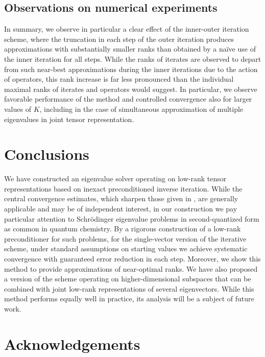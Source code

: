 \documentclass[a4paper,11pt,oneside]{amsart}
\theoremstyle{definition}
\theoremstyle{remark}
\numberwithin{equation}{section}
\numberwithin{theorem}{section}
\begin{document}
\subsection{Observations on numerical experiments}\label{sec:expobs}
In summary, we observe in particular a clear effect of the inner-outer iteration scheme, where the truncation in each step of the outer iteration produces approximations with substantially smaller ranks than obtained by a na\"ive use of the inner iteration for all steps. While the ranks of iterates are observed to depart from such near-best approximations during the inner iterations due to the action of operators, this rank increase is far less pronounced than the individual maximal ranks of iterates and operators would suggest. In particular, we observe favorable performance of the method and controlled convergence also for larger values of $K$, including in the case of simultaneous approximation of multiple eigenvalues in joint tensor representation.

%
%
%
%
%

\section{Conclusions}

We have constructed an eigenvalue solver operating on low-rank tensor representations based on inexact preconditioned inverse iteration. While the central convergence estimates, which sharpen those given in \cite{Rohwedder:11}, are generally applicable and may be of independent interest, in our construction we pay particular attention to Schr\"odinger eigenvalue problems in second-quantized form as common in quantum chemistry.
By a rigorous construction of a low-rank preconditioner for such problems, for the single-vector version of the iterative scheme, under standard assumptions on starting values we achieve systematic convergence with guaranteed error reduction in each step. Moreover, we show this method to provide approximations of near-optimal ranks.
We have also proposed a version of the scheme operating on higher-dimensional subspaces that can be combined with joint low-rank representations of several eigenvectors. While this method performs equally well in practice, its analysis will be a subject of future work.



\section*{Acknowledgements}
\end{document}
